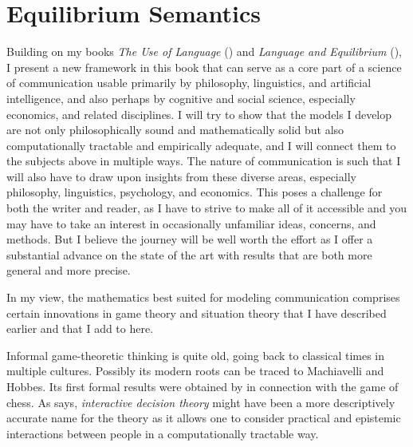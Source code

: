 \section{Equilibrium Semantics} \label{sec:equilibrium semantics}


\noindent Building on my books \emph{The Use of Language} (\citeyear{parikh:ul}) and \emph{Language and Equilibrium} (\citeyear{parikh:le}), I present a new framework in this book that can serve as a core part of a science of communication usable primarily by philosophy, linguistics, and artificial intelligence, and also perhaps by cognitive and social science, especially economics, and related disciplines. I will try to show that the models I develop are not only philosophically sound and mathematically solid but also computationally tractable and empirically adequate, and I will connect them to the subjects above in multiple ways. The nature of communication is such that I will also have to draw upon insights from these diverse areas, especially philosophy, linguistics, psychology, and economics. This poses a challenge for both the writer and reader, as I have to strive to make all of it accessible and you may have to take an interest in occasionally unfamiliar ideas, concerns, and methods. But I believe the journey will be well worth the effort as I offer a substantial advance on the state of the art with results that are both more general and more precise.

In my view, the mathematics best suited for modeling communication comprises certain innovations in game theory and situation theory that I have described earlier and that I add to here. 

Informal game-theoretic thinking is quite old, going back to classical times in multiple cultures. Possibly its modern roots can be traced to Machiavelli and Hobbes. Its first formal results were obtained by \citet{zermelo:chess} in connection with the game of chess. As \citet[1]{myerson:gt} says, \emph{interactive decision theory} might have been a more descriptively accurate name for the theory as it allows one to consider practical and epistemic interactions between people in a computationally tractable way.

